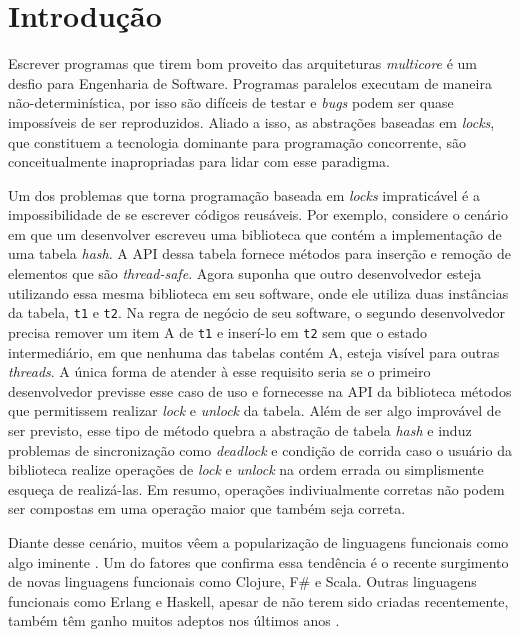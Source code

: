 \chapter{Introdução}

Escrever programas que tirem bom proveito das arquiteturas \emph{multicore} é um desfio para Engenharia de Software. Programas paralelos executam de maneira não-determinística, por isso são difíceis de testar e \emph{bugs} podem ser quase impossíveis de ser reproduzidos. Aliado a isso, as abstrações baseadas em \emph{locks}, que constituem a tecnologia dominante para programação concorrente, são conceitualmente inapropriadas para lidar com esse paradigma. \cite{jones2007beautiful}

Um dos problemas que torna programação baseada em \emph{locks} impraticável é a impossibilidade de se escrever códigos reusáveis. Por exemplo, considere o cenário em que um desenvolver escreveu uma biblioteca que contém a implementação de uma tabela \emph{hash}. A API dessa tabela fornece métodos para inserção e remoção de elementos que são \emph{thread-safe}. Agora suponha que outro desenvolvedor esteja utilizando essa mesma biblioteca em seu software, onde ele utiliza duas instâncias da tabela, \verb|t1| e \verb|t2|. Na regra de negócio de seu software, o segundo desenvolvedor precisa remover um item A de \verb|t1| e inserí-lo em \verb|t2| sem que o estado intermediário, em que nenhuma das tabelas contém A, esteja visível para outras \emph{threads}. A única forma de atender à esse requisito seria se o primeiro desenvolvedor previsse esse caso de uso e fornecesse na API da biblioteca métodos que permitissem realizar \emph{lock} e \emph{unlock} da tabela. Além de ser algo improvável de ser previsto, esse 
tipo de método quebra a abstração de tabela \emph{hash} e induz problemas de sincronização como \emph{deadlock} e condição de corrida caso o usuário da biblioteca realize operações de \emph{lock} e \emph{unlock} na ordem errada ou simplismente esqueça de realizá-las. Em resumo, operações indiviualmente corretas não podem ser compostas em uma operação maior que também seja correta. \cite{harris2005composable}

Diante desse cenário, muitos vêem a popularização de linguagens funcionais como algo iminente \cite{theeconomist}. Um do fatores que confirma essa tendência é o recente surgimento de novas linguagens funcionais como Clojure, F\# e Scala. Outras linguagens funcionais como Erlang e Haskell, apesar de não terem sido criadas recentemente, também têm ganho muitos adeptos nos últimos anos \cite{ycombinator}.

